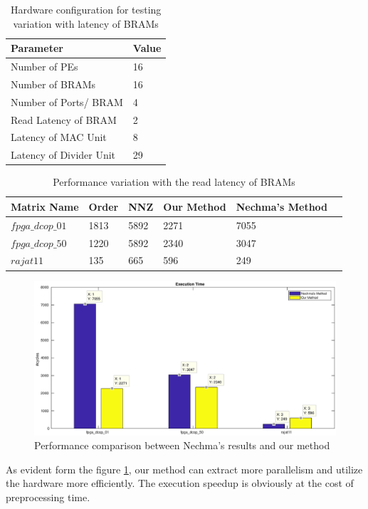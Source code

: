 \begin{table}[H]
    \centering
    \caption{Hardware configuration for testing variation with latency of BRAMs}
    \label{tab:res:barmLatVar:hwConfig}
    \begin{tabular}{L{6cm} L{1.5cm}}
        \toprule
        Parameter & Value \\
        \midrule
        Number of PEs           & 16  \\
        Number of BRAMs         & 16         \\
        Number of Ports/ BRAM   & 4         \\
        Read Latency of BRAM    & 2          \\
        Latency of MAC Unit     & 8          \\
        Latency of Divider Unit & 29          \\
        \bottomrule
    \end{tabular}
\end{table}


\begin{table}[H]
    \centering
    \caption{Performance variation with the read latency of BRAMs}
    \label{tab:res:bramLatVar:data}
    \begin{tabular}{l l l l l l} 
        \toprule
        Matrix Name & Order  & NNZ & Our Method & Nechma's Method \\
        \midrule
        $fpga\_dcop\_01$ & 1813 & 5892 &  2271    &  7055   \\
        $fpga\_dcop\_50$ & 1220 & 5892 &   2340   &   3047  \\
        $rajat11$      & 135  &  665   &    596   &    249    \\
        \bottomrule
    \end{tabular}
\end{table}

\begin{figure}[H]
    \centering
    \includegraphics[width = \textwidth]{./Results/cmp.eps}
    \caption{Performance comparison between Nechma's \cite{Nechma} results and our method}
    \label{fig:res:cmp:plot}
\end{figure}

As evident form the figure \ref{fig:res:cmp:plot}, our method can extract more parallelism
and utilize the hardware more efficiently. The execution speedup is obviously
at the cost of preprocessing time.

\pagebreak


